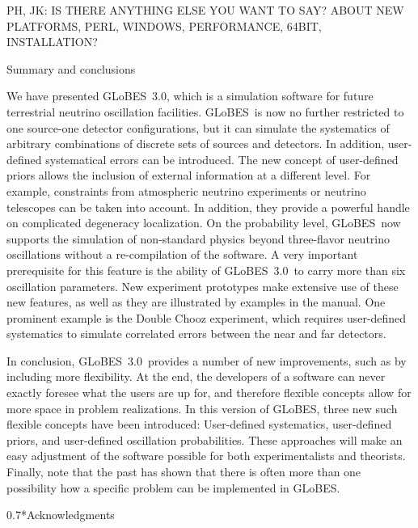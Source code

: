 \documentclass[12pt,a4paper]{article}
\makeatletter
\renewcommand{\section}{\@startsection{section}{1}{0em}{-\baselineskip}%
{\baselineskip}{\normalfont\large\bfseries}}
\renewcommand{\subsection}%
{\@startsection{subsection}{2}{0em}{-0.7\baselineskip}%
{0.7\baselineskip}{\normalfont\bfseries}}
\newcommand{\GLOBES}{{\sf GLoBES}}
\newcommand{\GLOBESN}{{\sf GLoBES~3.0}}
\makeatother
\begin{document}
PH, JK: IS THERE ANYTHING ELSE YOU WANT TO SAY? ABOUT NEW PLATFORMS,
PERL, WINDOWS, PERFORMANCE, 64BIT, INSTALLATION?

\section{Summary and conclusions}

We have presented \GLOBESN , which is a simulation software for 
future terrestrial neutrino oscillation facilities. \GLOBES\ is now no further
restricted to one source-one detector configurations, but it can simulate
the systematics of arbitrary combinations of discrete sets of sources and
detectors. In addition, user-defined systematical errors can be introduced.
The new concept of user-defined priors allows the inclusion of external
information at a different level. For example, constraints from atmospheric
neutrino experiments or neutrino telescopes can be taken into account. In addition,
they provide a powerful handle on complicated degeneracy localization.
On the probability level, \GLOBES\ now supports the simulation of non-standard
physics beyond three-flavor neutrino oscillations without a re-compilation of
the software. A very important prerequisite for this feature is the ability
of \GLOBESN\ to carry more than six oscillation parameters. New experiment
prototypes make extensive use of these new features, as well as they are illustrated by
examples in the manual. One prominent example is the Double Chooz experiment,
which requires user-defined systematics to simulate correlated errors between
the near and far detectors.

In conclusion, \GLOBESN\ provides a number of new improvements, such as by
 including more flexibility. At the end, the developers of a software can never
exactly foresee what the users are up for, and therefore flexible concepts
allow for more space in problem realizations. In this version of \GLOBES ,
three new such flexible concepts have been introduced: User-defined systematics,
user-defined priors, and user-defined oscillation probabilities. These approaches
will make an easy adjustment of the software possible for both experimentalists and theorists.
Finally, note that the past has shown that there is often more than one possibility 
how a specific problem can be implemented in \GLOBES .

\subsection*{Acknowledgments}
\end{document}
